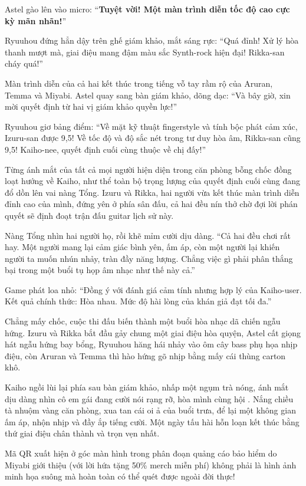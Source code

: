 \documentclass[../main.tex]{subfiles}
\begin{document}
Astel gào lên vào micro: ``\textbf{Tuyệt vời! Một màn trình diễn tốc độ cao cực kỳ mãn nhãn!}''

Ryuuhou đứng hẳn dậy trên ghế giám khảo, mắt sáng rực: ``Quá đỉnh! Xử lý hòa thanh mượt mà, giai điệu mang đậm màu sắc Synth-rock hiện đại! Rikka-san cháy quá!''

Màn trình diễn của cả hai kết thúc trong tiếng vỗ tay rầm rộ của Aruran, Temma và Miyabi. Astel quay sang bàn giám khảo, dõng dạc: ``Và bây giờ, xin mời quyết định từ hai vị giám khảo quyền lực!''

Ryuuhou giơ bảng điểm: ``Về mặt kỹ thuật fingerstyle và tính bộc phát cảm xúc, Izuru-san được 9,5! Về tốc độ và độ sắc nét trong tư duy hòa âm, Rikka-san cũng 9,5! Kaiho-nee, quyết định cuối cùng thuộc về chị đấy!''

Từng ánh mắt của tất cả mọi người hiện diện trong căn phòng bỗng chốc đồng loạt hướng về Kaiho, như thể toàn bộ trọng lượng của quyết định cuối cùng đang đổ dồn lên vai nàng Tổng. Izuru và Rikka, hai người vừa kết thúc màn trình diễn đỉnh cao của mình, đứng yên ở phía sân đấu, cả hai đều nín thở chờ đợi lời phán quyết sẽ định đoạt trận đấu guitar lịch sử này.

Nàng Tổng nhìn hai người họ, rồi khẽ mỉm cười dịu dàng. ``Cả hai đều chơi rất hay. Một người mang lại cảm giác bình yên, ấm áp, còn một người lại khiến người ta muốn nhún nhảy, tràn đầy năng lượng. Chẳng việc gì phải phân thắng bại trong một buổi tụ họp âm nhạc như thế này cả.''

Game phát loa nhỏ: ``Đồng ý với đánh giá cảm tính nhưng hợp lý của Kaiho-user. Kết quả chính thức: Hòa nhau. Mức độ hài lòng của khán giả đạt tối đa.''

Chẳng mấy chốc, cuộc thi đấu biến thành một buổi hòa nhạc dã chiến ngẫu hứng. Izuru và Rikka bắt đầu gảy chung một giai điệu hòa quyện, Astel cất giọng hát ngẫu hứng bay bổng, Ryuuhou hăng hái nhảy vào ôm cây bass phụ họa nhịp điệu, còn Aruran và Temma thì hào hứng gõ nhịp bằng mấy cái thùng carton khô.

Kaiho ngồi lùi lại phía sau bàn giám khảo, nhấp một ngụm trà nóng, ánh mắt dịu dàng nhìn cô em gái đang cười nói rạng rỡ, hòa mình cùng hội \hls. Nắng chiều tà nhuộm vàng căn phòng, xua tan cái oi ả của buổi trưa, để lại một không gian ấm áp, nhộn nhịp và đầy ắp tiếng cười. Một ngày tấu hài hỗn loạn kết thúc bằng thứ giai điệu chân thành và trọn vẹn nhất.

\trva

Mã QR xuất hiện ở góc màn hình trong phân đoạn quảng cáo bảo hiểm do Miyabi giới thiệu (với lời hứa tặng 50\% merch miễn phí) không phải là hình ảnh minh họa suông mà hoàn toàn có thể quét được ngoài đời thực!
\end{document}
